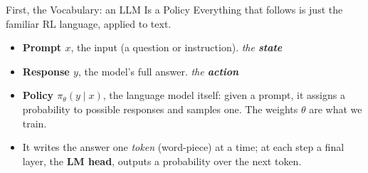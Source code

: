 \begin{frame}{First, the Vocabulary: an LLM Is a Policy}
Everything that follows is just the familiar RL language, applied to text.
\vfill
\begin{itemize}\itemsep0.4em\small
    \item \textbf{Prompt $x$}, the input (a question or instruction).
          \hfill \emph{the \textbf{state}}
    \item \textbf{Response $y$}, the model's full answer.
          \hfill \emph{the \textbf{action}}
    \item \textbf{Policy $\pi_\theta(y \mid x)$}, the language model itself:
          given a prompt, it assigns a probability to possible responses and
          samples one. The weights $\theta$ are what we train.
    \item It writes the answer one \emph{token} (word-piece) at a time; at each step
          a final layer, the \textbf{LM head}, outputs a probability over the
          next token.
\end{itemize}
\vfill
\begin{center}
\end{center}
\end{frame}

